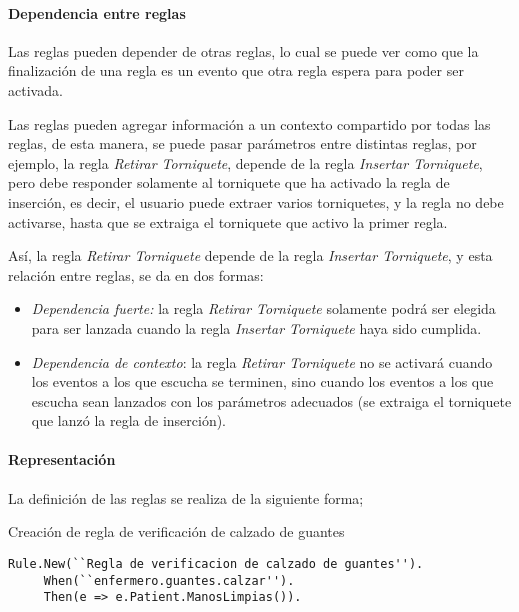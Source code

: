\paragraph{Dependencia entre reglas}


Las reglas pueden depender de otras reglas, lo cual se puede ver como que la
finalización de una regla es un evento que otra regla espera para poder ser
activada.

Las reglas pueden agregar información a un contexto compartido por todas las
reglas, de esta manera, se puede pasar parámetros entre distintas reglas, por
ejemplo, la regla \emph{Retirar Torniquete}, depende de la regla \emph{Insertar
Torniquete}, pero debe responder solamente al torniquete que ha activado
la regla de inserción, es decir, el usuario puede extraer varios torniquetes, y
la regla no debe activarse, hasta que se extraiga el torniquete que activo la
primer regla.

Así, la regla \emph{Retirar Torniquete} depende de la regla \emph{Insertar
Torniquete}, y esta relación entre reglas, se da en dos
formas\cite{bailey2004event}:

\begin{itemize}
\item  \emph{Dependencia fuerte:} la regla \emph{Retirar Torniquete} solamente podrá
	ser elegida para ser lanzada cuando la regla \emph{Insertar Torniquete}
	haya sido cumplida.
\item  \emph{Dependencia de contexto}: la regla \emph{Retirar Torniquete} no se
	activará cuando los eventos a los que escucha se terminen, sino cuando
	los eventos a los que escucha sean lanzados con los parámetros adecuados
	(se extraiga el torniquete que lanzó la regla de inserción).
\end{itemize}

\paragraph{Representación}

La definición de las reglas se realiza de la siguiente forma;
\begin{algorithm}[H]
\caption{Creación de regla de verificación de calzado de guantes}
\label{alg:rule:guante}
\lstset{style=sharpc}
\begin{lstlisting}
Rule.New(``Regla de verificacion de calzado de guantes'').
     When(``enfermero.guantes.calzar'').
     Then(e => e.Patient.ManosLimpias()).
\end{lstlisting}
\end{algorithm}

